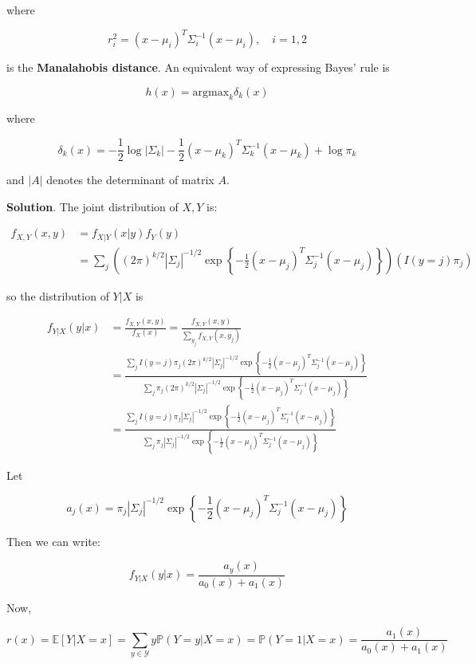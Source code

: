 where

\[ r_i^2 = (x - \mu_i)^T \Sigma_i^{-1}(x - \mu_i), \quad i = 1, 2 \]

is the \textbf{Manalahobis distance}. An equivalent way of expressing
Bayes' rule is

\[ h(x) = \text{argmax}_k \delta_k(x) \]

where

\[ \delta_k(x) = -\frac{1}{2} \log | \Sigma_k | - \frac{1}{2} (x - \mu_k)^T \Sigma_k^{-1} (x - \mu_k) + \log \pi_k \]

and \(|A|\) denotes the determinant of matrix \(A\).

\textbf{Solution}. The joint distribution of \(X, Y\) is:

\[
\begin{align}
f_{X, Y}(x, y) &= f_{X | Y}(x | y) f_Y(y) \\
&= \sum_j \left( (2 \pi)^{k / 2} |\Sigma_j|^{-1/2} \exp \left\{ -\frac{1}{2} (x - \mu_j)^T \Sigma_j^{-1} (x - \mu_j) \right\} \right) \left( I(y = j) \pi_j \right)
\end{align}
\]

so the distribution of \(Y | X\) is

\[
\begin{align}
f_{Y | X}(y | x) &= \frac{f_{X, Y}(x, y)}{f_X(x)} = \frac{f_{X, Y}(x, y)}{\sum_{y_j} f_{X, Y}(x, y_j)} \\
&= \frac{\sum_j I(y = j) \pi_j (2 \pi)^{k / 2} |\Sigma_j|^{-1/2} \exp \left\{ -\frac{1}{2} (x - \mu_j)^T \Sigma_j^{-1} (x - \mu_j) \right\}}{\sum_j \pi_j (2 \pi)^{k / 2} |\Sigma_j|^{-1/2} \exp \left\{ -\frac{1}{2} (x - \mu_j)^T \Sigma_j^{-1} (x - \mu_j) \right\}} \\
&= \frac{\sum_j I(y = j) \pi_j |\Sigma_j|^{-1/2} \exp \left\{ -\frac{1}{2} (x - \mu_j)^T \Sigma_j^{-1} (x - \mu_j) \right\}}{\sum_j \pi_j |\Sigma_j|^{-1/2} \exp \left\{ -\frac{1}{2} (x - \mu_j)^T \Sigma_j^{-1} (x - \mu_j) \right\}}
\end{align}
\]

Let

\[ a_j(x) = \pi_j |\Sigma_j|^{-1/2} \exp \left\{ -\frac{1}{2} (x - \mu_j)^T \Sigma_j^{-1} (x - \mu_j) \right\} \]

Then we can write:

\[
f_{Y | X}(y | x) = \frac{a_y(x)}{a_0(x) + a_1(x)}
\]

Now,

\[ r(x) = \mathbb{E}[Y | X = x] = \sum_{y \in \mathcal{Y}} y \mathbb{P}(Y = y | X = x) = \mathbb{P}(Y = 1 | X = x) = \frac{a_1(x)}{a_0(x) + a_1(x)}\]

